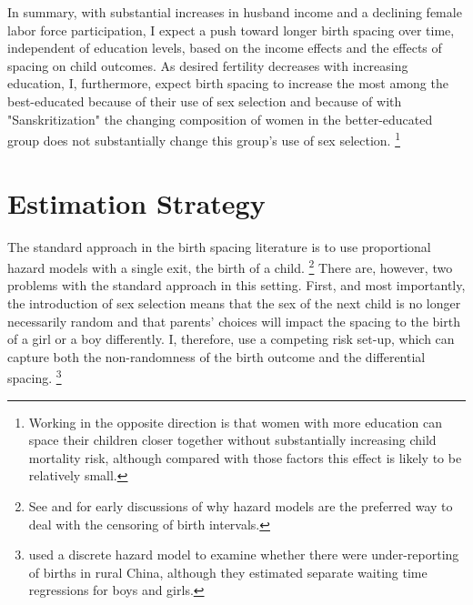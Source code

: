 \documentclass[12pt,letterpaper]{article}
\begin{document}
In summary, with substantial increases in husband income and a declining female labor 
force participation, I expect a push toward longer birth spacing over time, independent
of education levels, based on the income effects and the effects of spacing
on child outcomes.
As desired fertility decreases with increasing education, I, furthermore, expect 
birth spacing to increase the most among the best-educated because of their 
use of sex selection and because of with "Sanskritization" the changing composition 
of women in the better-educated group does not substantially change this 
group's use of sex selection.%
\footnote{
Working in the opposite direction is that women with more education can space
their children closer together without substantially increasing child mortality risk,
although compared with those factors this effect is likely to be relatively small.
}




\section{Estimation Strategy\label{sec:strategy}}


The standard approach in the birth spacing literature is to use proportional hazard
models with a single exit, the birth of a child.%
\footnote{
See \citet{Sheps1970} and \citet{Newman1984} for early discussions of why 
hazard models are the preferred way to deal with the censoring of birth
intervals.
}
There are, however, two problems with the standard approach in this setting.
First, and most importantly, the introduction of sex selection means that the sex of the 
next child is no longer necessarily random and that parents' choices will impact the 
spacing to the birth of a girl or a boy differently.
I, therefore, use a competing risk set-up, which can capture both the non-randomness of
the birth outcome and the differential spacing.%
\footnote{
\cite{Merli2000} used a discrete hazard model to examine whether 
there were under-reporting of births in rural China, although they 
estimated separate waiting time regressions for boys and girls.
}
\end{document}
